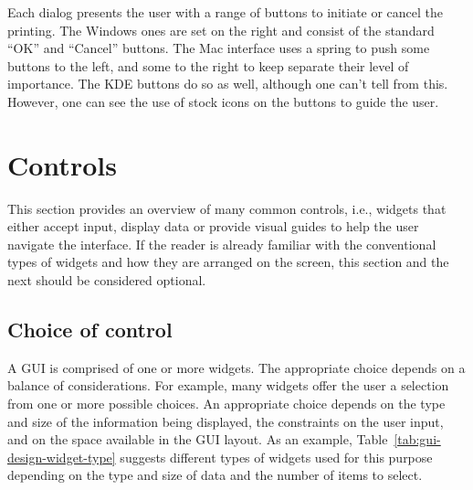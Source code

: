Each dialog presents the user with a range of buttons to initiate or
cancel the printing. The Windows ones are set on the right and consist
of the standard ``OK'' and ``Cancel'' buttons. The Mac interface uses
a spring to push some buttons to the left, and some to the right to
keep separate their level of importance. The KDE buttons do so as
well, although one can't tell from this. However, one can see the use
of stock icons on the buttons to guide the user. 


\section{Controls}
\label{sec:GUI:basic-components}

This section provides an overview of many common controls, i.e.,
widgets that either accept input, display data or provide visual
guides to help the user navigate the interface. If the reader is
already familiar with the conventional types of widgets and how they
are arranged on the screen, this section and the next should be
considered optional.


\subsection{Choice of control}
\label{sec:choice-widget}

A GUI is comprised of one or more widgets. The appropriate choice
depends on a balance of considerations.  For example, many widgets
offer the user a selection from one or more possible choices.  An
appropriate choice depends on the type and size of the information
being displayed, the constraints on the user input, and on the space
available in the GUI layout. As an example,
Table~\ref{tab:gui-design-widget-type} suggests different types
of widgets used for this purpose depending on the type and size of
data and the number of items to select.
  
